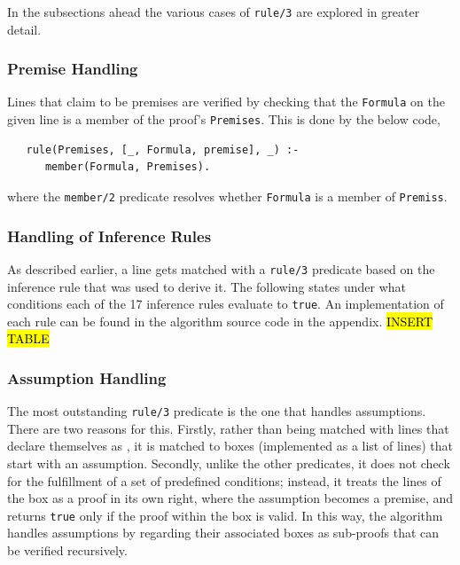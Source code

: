 \documentclass[a4paper, 11pt]{article}
\begin{document}
   In the subsections ahead the various cases of
   \texttt{rule/3} are explored in greater detail.

   \subsubsection{Premise Handling}
   \label{premise-handling}
   Lines that claim to be premises are verified by checking
   that the \texttt{Formula} on the given line is a member of 
   the proof's \texttt{Premises}. This is done by the below
   code, 
   
\begin{verbatim}
   rule(Premises, [_, Formula, premise], _) :-
      member(Formula, Premises).
\end{verbatim}

   where the \texttt{member/2} predicate resolves
   whether \texttt{Formula} is a member of \texttt{Premiss}. 

   \subsubsection{Handling of Inference Rules}
   \label{handling-of-inference-rules}

   As described earlier, a line gets matched with a 
   \texttt{rule/3} predicate based on the inference rule that 
   was used to derive it. The following states under what
   conditions each of the 17 inference rules evaluate to
   \texttt{true}. An implementation of each rule can be found
   in the algorithm source code in the appendix.
   \bigbreak
   \hl{INSERT TABLE}

   \subsubsection{Assumption Handling}
   \label{assumption-handling}
   The most outstanding \texttt{rule/3} predicate is the one
   that handles assumptions. There are two reasons for this.
   Firstly, rather than being matched with lines that declare
   themselves as , it is matched to
   boxes (implemented as a list of lines) that start with an 
   assumption. Secondly, unlike the other predicates, it does
   not check for the fulfillment of a set of predefined
   conditions; instead, it treats the lines of the box as a
   proof in its own right, where the assumption becomes a
   premise, and returns \texttt{true} only if the proof within
   the box is valid. In this way, the algorithm handles
   assumptions by regarding their associated boxes as 
   sub-proofs that can be verified recursively.
   \bigbreak
\end{document}
